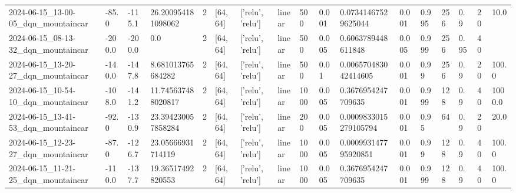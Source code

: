 \documentclass[a4paper,12pt]{article}
\begin{document}
\begin{table}[]
\begin{tabular}{lllllllllllllllll}
    2024-06-15\_13-00-05\_dqn\_mountaincar & -85.0                 & -115.1                  & 26.200954181098062     & 2              & {[}64, 64{]}      & {[}'relu', 'relu'{]}   & linear                    & 500           & 0.001          & 0.07341467529625044   & 0.001        & 0.995          & 256         & 0.9      & 20                    & 10.0          \\
    2024-06-15\_08-13-32\_dqn\_mountaincar & -200.0                & -200.0                  & 0.0                    & 2              & {[}64, 64{]}      & {[}'relu', 'relu'{]}   & linear                    & 500           & 0.005          & 0.6063789448611848    & 0.005        & 0.999          & 256         & 0.95     & 40                    &               \\
    2024-06-15\_13-20-27\_dqn\_mountaincar & -140.0                & -147.8                  & 8.681013765684282      & 2              & {[}64, 64{]}      & {[}'relu', 'relu'{]}   & linear                    & 500           & 0.01           & 0.006570483042414605  & 0.001        & 0.99           & 256         & 0.9      & 20                    & 100.0         \\
    2024-06-15\_10-54-10\_dqn\_mountaincar & -108.0                & -141.2                  & 11.745637488020817     & 2              & {[}64, 64{]}      & {[}'relu', 'relu'{]}   & linear                    & 1000          & 0.005          & 0.3676954247709635    & 0.001        & 0.999          & 128         & 0.9      & 40                    & 1000.0        \\
    2024-06-15\_13-41-53\_dqn\_mountaincar & -92.0                 & -130.9                  & 23.394230057858284     & 2              & {[}64, 64{]}      & {[}'relu', 'relu'{]}   & linear                    & 200           & 0.005          & 0.0009833015279105794 & 0.001        & 0.95           & 64          & 0.9      & 20                    & 20.0          \\
    2024-06-15\_12-23-27\_dqn\_mountaincar & -87.0                 & -126.7                  & 23.05666931714119      & 2              & {[}64, 64{]}      & {[}'relu', 'relu'{]}   & linear                    & 1000          & 0.005          & 0.000993147795920851  & 0.001        & 0.99           & 128         & 0.9      & 40                    & 100.0         \\
    2024-06-15\_11-21-25\_dqn\_mountaincar & -110.0                & -137.7                  & 19.36517492820553      & 2              & {[}64, 64{]}      & {[}'relu', 'relu'{]}   & linear                    & 1000          & 0.005          & 0.3676954247709635    & 0.001        & 0.999          & 128         & 0.9      & 40                    & 100.0         \\

\end{tabular}
\end{table}
\end{document}
